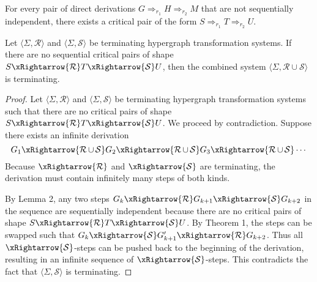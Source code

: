 \begin{lemma}
    For every pair of direct derivations $G \mathop{\Rightarrow}_{r_1} H \mathop{\Rightarrow}_{r_2} M$ that are not sequentially independent, there exists a critical pair of the form $S \mathop{\Rightarrow}_{r_1} T \mathop{\Rightarrow}_{r_2} U$.
\end{lemma}

\begin{theorem}
     Let $\langle \Sigma, \mathcal{R} \rangle$ and $\langle \Sigma, \mathcal{S} \rangle$ be terminating hypergraph transformation systems. If there are no sequential critical pairs of shape $S \xRightarrow{\mathcal{R}} T \xRightarrow{\mathcal{S}} U$, then the combined system $\langle \Sigma, \mathcal{R} \mathop{\cup} \mathcal{S} \rangle$ is terminating.
\end{theorem}
 \begin{proof}
    Let $\langle \Sigma, \mathcal{R} \rangle$ and $\langle \Sigma, \mathcal{S} \rangle$ be terminating hypergraph transformation systems such that there are no critical pairs of shape $S \xRightarrow{\mathcal{R}} T \xRightarrow{\mathcal{S}} U$. We proceed by contradiction. Suppose there exists an infinite derivation
    \[
    G_1 \xRightarrow{\mathcal{R} \mathop{\cup} \mathcal{S}} G_2 \xRightarrow{\mathcal{R} \mathop{\cup} \mathcal{S}} G_3 \xRightarrow{\mathcal{R} \mathop{\cup} \mathcal{S}} \cdots
    \]
    Because $\xRightarrow{\mathcal{R}}$ and $\xRightarrow{\mathcal{S}}$ are terminating, the derivation must contain infinitely many steps of both kinds. 
    
    By Lemma 2, any two steps $G_k \xRightarrow{\mathcal{R}} G_{k+1} \xRightarrow{\mathcal{S}} G_{k+2}$ in the sequence are sequentially independent because there are no critical pairs of shape $S \xRightarrow{\mathcal{R}} T \xRightarrow{\mathcal{S}} U$. By Theorem 1, the steps can be swapped such that $G_k \xRightarrow{\mathcal{S}} G'_{k+1} \xRightarrow{\mathcal{R}} G_{k+2}$. Thus all $\xRightarrow{\mathcal{S}}$-steps can be pushed back to the beginning of the derivation, resulting in an infinite sequence of $\xRightarrow{\mathcal{S}}$-steps. This contradicts the fact that $\langle \Sigma, \mathcal{S} \rangle$ is terminating.

 \end{proof}